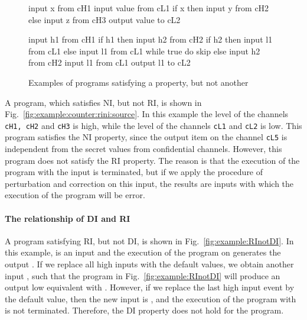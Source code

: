 \documentclass[10pt,a4paper,oneside]{article}
\def\linecode#1{{\texttt{#1}}}
\begin{document}
\begin{figure}
\centering
\begin{lrbox}{\mylistingbox}\begin{minipage}{0.37\textwidth}
\vspace{55pt}
\begin{javascript}
input x from cH1
input value from cL1
if x then
    input y from cH2
else
    input z from cH3
output value to cL2
\end{javascript}
\end{minipage}
\end{lrbox}
 \hspace{10pt}
\begin{lrbox}{\mylistingbox}\begin{minipage}{0.37 \textwidth}
\begin{javascript}
input h1 from cH1
if h1 then
    input h2 from cH2
    if h2 then
        input l1 from cL1
    else
        input l1 from cL1
        while true do skip
else
    input h2 from cH2
    input l1 from cL1
output l1 to cL2
\end{javascript}
\end{minipage}
\end{lrbox}
\caption{Examples of programs satisfying a property, but not another}
\label{fig:example:counter:source}
\end{figure}

A program, which satisfies NI, but not RI, is shown in  Fig.~\ref{fig:example:counter:rini:source}. In this example the level of the channels \linecode{cH1, cH2} and \linecode{cH3} is high, while the level of the channels \linecode{cL1} and \linecode{cL2} is low. This program satisfies the NI property, since the output item on the channel \linecode{cL5} is independent from the secret values from confidential channels. However, this program does not satisfy the RI property. The reason is that the execution of the program with the input  is terminated, but if we apply the procedure of perturbation and correction on this input, the results are inputs with which the execution of the program will be error.


\paragraph{The relationship of DI and RI}
A program satisfying RI, but not DI, is shown in Fig.~\ref{fig:example:RInotDI}. In this example,  is an input and the execution of the program on  generates the output . If we replace all high inputs with the default values, we obtain another input , such that the program in Fig.~\ref{fig:example:RInotDI} will produce an output low equivalent with . However, if we replace the last high input event by the default value, then the new input is , and the execution of the program with  is not terminated. Therefore, the DI property does not hold for the program.
\end{document}
